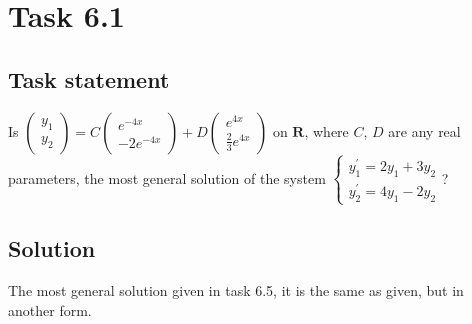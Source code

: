 \section*{Task 6.1}

\subsection*{Task statement}

Is $\begin{pmatrix}
    y_1 \\ y_2
\end{pmatrix} = C \begin{pmatrix}
    e^{-4x} \\ -2e^{-4x}
\end{pmatrix} + D \begin{pmatrix}
    e^{4x} \\ \frac{2}{3}e^{4x}
\end{pmatrix}$ on $\mathbf{R}$, where $C$, $D$ are any real parameters, the most general solution of the system $\begin{cases}
    y_1^{\prime} = 2y_1 + 3y_2 \\
    y_2^{\prime} = 4y_1 - 2y_2
\end{cases}$?

\subsection*{Solution}

The most general solution given in task 6.5, it is the same as given, but in another form.
